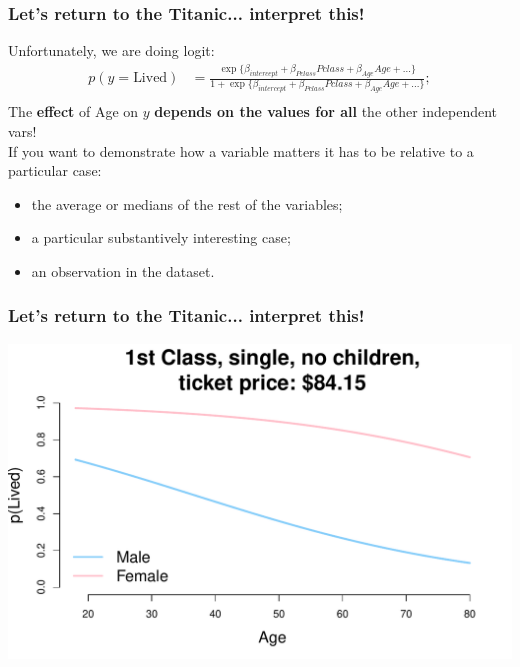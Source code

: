 \documentclass[aspectratio=169]{beamer}
\begin{document}
\begin{frame}
\frametitle{Let's return to the Titanic... interpret this!}

Unfortunately, we are doing logit:
\begin{align*}
p(y = \mbox{Lived}) &= \frac{\exp\{\beta_{intercept} + \beta_{Pclass}Pclass + \beta_{Age}Age + ...\}}{1 + \exp\{\beta_{intercept} + \beta_{Pclass}Pclass + \beta_{Age}Age + ...\}};\\
\end{align*}
\bigskip
\bigskip
{}The \textbf{effect} of Age on $y$ \textbf{depends on the values for all} the other independent vars!\\
\bigskip
If you want to demonstrate how a variable matters it has to be relative to a particular case:
\begin{itemize}
\item the average or medians of the rest of the variables;
\item a particular substantively interesting case;
\item an observation in the dataset.
\end{itemize}
\end{frame}

\begin{frame}
\frametitle{Let's return to the Titanic... interpret this!}

\begin{center}
\includegraphics[scale=0.55]{titanic_prediction.pdf}
\end{center}

\end{frame}
\end{document}
